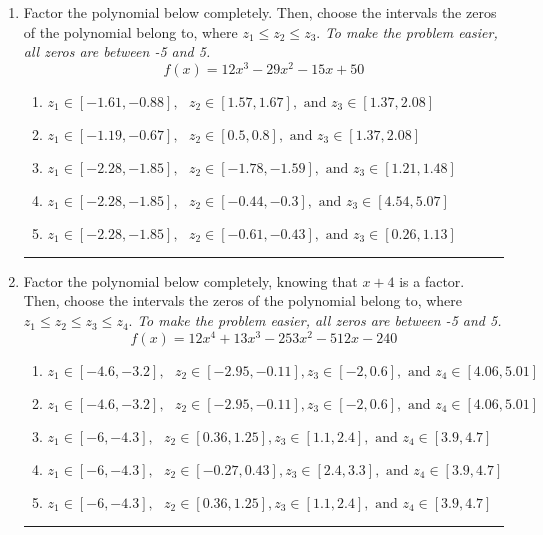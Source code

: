 \documentclass[14pt]{extbook}
\newcommand{\litem}[1]{\item#1\hspace*{-1cm}\rule{\textwidth}{0.4pt}}
\begin{document}
\begin{enumerate}
\litem{
Factor the polynomial below completely. Then, choose the intervals the zeros of the polynomial belong to, where $z_1 \leq z_2 \leq z_3$. \textit{To make the problem easier, all zeros are between -5 and 5.}\[ f(x) = 12x^{3} -29 x^{2} -15 x + 50 \]\begin{enumerate}[label=\Alph*.]
\item \( z_1 \in [-1.61, -0.88], \text{   }  z_2 \in [1.57, 1.67], \text{   and   } z_3 \in [1.37, 2.08] \)
\item \( z_1 \in [-1.19, -0.67], \text{   }  z_2 \in [0.5, 0.8], \text{   and   } z_3 \in [1.37, 2.08] \)
\item \( z_1 \in [-2.28, -1.85], \text{   }  z_2 \in [-1.78, -1.59], \text{   and   } z_3 \in [1.21, 1.48] \)
\item \( z_1 \in [-2.28, -1.85], \text{   }  z_2 \in [-0.44, -0.3], \text{   and   } z_3 \in [4.54, 5.07] \)
\item \( z_1 \in [-2.28, -1.85], \text{   }  z_2 \in [-0.61, -0.43], \text{   and   } z_3 \in [0.26, 1.13] \)

\end{enumerate} }
\litem{
Factor the polynomial below completely, knowing that $x+4$ is a factor. Then, choose the intervals the zeros of the polynomial belong to, where $z_1 \leq z_2 \leq z_3 \leq z_4$. \textit{To make the problem easier, all zeros are between -5 and 5.}\[ f(x) = 12x^{4} +13 x^{3} -253 x^{2} -512 x -240 \]\begin{enumerate}[label=\Alph*.]
\item \( z_1 \in [-4.6, -3.2], \text{   }  z_2 \in [-2.95, -0.11], z_3 \in [-2, 0.6], \text{   and   } z_4 \in [4.06, 5.01] \)
\item \( z_1 \in [-4.6, -3.2], \text{   }  z_2 \in [-2.95, -0.11], z_3 \in [-2, 0.6], \text{   and   } z_4 \in [4.06, 5.01] \)
\item \( z_1 \in [-6, -4.3], \text{   }  z_2 \in [0.36, 1.25], z_3 \in [1.1, 2.4], \text{   and   } z_4 \in [3.9, 4.7] \)
\item \( z_1 \in [-6, -4.3], \text{   }  z_2 \in [-0.27, 0.43], z_3 \in [2.4, 3.3], \text{   and   } z_4 \in [3.9, 4.7] \)
\item \( z_1 \in [-6, -4.3], \text{   }  z_2 \in [0.36, 1.25], z_3 \in [1.1, 2.4], \text{   and   } z_4 \in [3.9, 4.7] \)


\end{enumerate}}
\end{enumerate}
\end{document}
